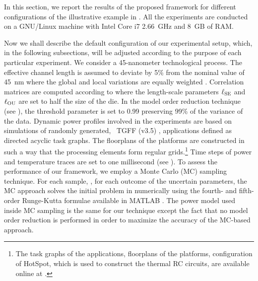 
In this section, we report the results of the proposed framework for different configurations of the illustrative example in .
All the experiments are conducted on a GNU/Linux machine with Intel Core i7 2.66~GHz and 8~GB of RAM.

Now we shall describe the default configuration of our experimental setup, which, in the following subsections, will be adjusted according to the purpose of each particular experiment.
We consider a 45-nanometer technological process.
The effective channel length is assumed to deviate by 5\% from the nominal value of 45~nm where the global and local variations are equally weighted \cite{juan2011, juan2012}.
Correlation matrices are computed according to  where the length-scale parameters $\ell_{\text{SE}}$ and $\ell_{\text{OU}}$ are set to half the size of the die.
In the model order reduction technique (see ), the threshold parameter is set to 0.99 preserving 99\% of the variance of the data.
Dynamic power profiles involved in the experiments are based on simulations of randomly generated, \via\ TGFF (v3.5) \cite{dick1998}, applications defined as directed acyclic task graphs.
The floorplans of the platforms are constructed in such a way that the processing elements form regular grids.\footnote{The task graphs of the applications, floorplans of the platforms, configuration of HotSpot, which is used to construct the thermal RC circuits, are available online at \cite{sources}.}
Time steps of power and temperature traces are set to one millisecond (see ).
To assess the performance of our framework, we employ a Monte Carlo (MC) sampling technique.
For each sample, \ie, for each outcome of the uncertain parameters, the MC approach solves the initial problem in  numerically using the fourth- and fifth-order Runge-Kutta formulae \cite{press2007} available in MATLAB \cite{matlab}.
The power model used inside MC sampling is the same for our technique except the fact that no model order reduction is performed in order to maximize the accuracy of the MC-based approach.

